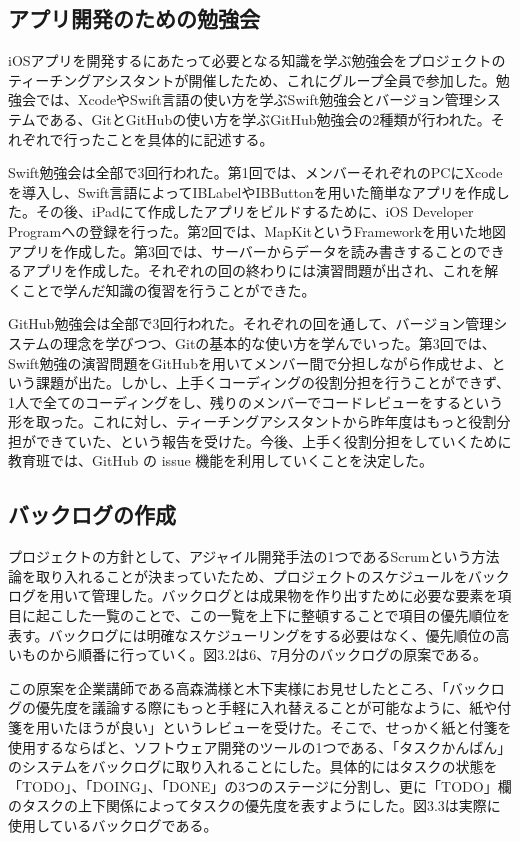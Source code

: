 \documentclass[openany,11pt,papersize]{jsbook}
\begin{document}
\subsection{アプリ開発のための勉強会}
\par iOSアプリを開発するにあたって必要となる知識を学ぶ勉強会をプロジェクトのティーチングアシスタントが開催したため、これにグループ全員で参加した。勉強会では、XcodeやSwift言語の使い方を学ぶSwift勉強会とバージョン管理システムである、GitとGitHubの使い方を学ぶGitHub勉強会の2種類が行われた。それぞれで行ったことを具体的に記述する。
\par Swift勉強会は全部で3回行われた。第1回では、メンバーそれぞれのPCにXcodeを導入し、Swift言語によってIBLabelやIBButtonを用いた簡単なアプリを作成した。その後、iPadにて作成したアプリをビルドするために、iOS Developer Programへの登録を行った。第2回では、MapKitというFrameworkを用いた地図アプリを作成した。第3回では、サーバーからデータを読み書きすることのできるアプリを作成した。それぞれの回の終わりには演習問題が出され、これを解くことで学んだ知識の復習を行うことができた。
\par GitHub勉強会は全部で3回行われた。それぞれの回を通して、バージョン管理システムの理念を学びつつ、Gitの基本的な使い方を学んでいった。第3回では、Swift勉強の演習問題をGitHubを用いてメンバー間で分担しながら作成せよ、という課題が出た。しかし、上手くコーディングの役割分担を行うことができず、1人で全てのコーディングをし、残りのメンバーでコードレビューをするという形を取った。これに対し、ティーチングアシスタントから昨年度はもっと役割分担ができていた、という報告を受けた。今後、上手く役割分担をしていくために教育班では、GitHub の issue 機能を利用していくことを決定した。

\subsection{バックログの作成}
\par プロジェクトの方針として、アジャイル開発手法の1つであるScrumという方法論を取り入れることが決まっていたため、プロジェクトのスケジュールをバックログを用いて管理した。バックログとは成果物を作り出すために必要な要素を項目に起こした一覧のことで、この一覧を上下に整頓することで項目の優先順位を表す。バックログには明確なスケジューリングをする必要はなく、優先順位の高いものから順番に行っていく。図3.2は6、7月分のバックログの原案である。

\par この原案を企業講師である高森満様と木下実様にお見せしたところ、「バックログの優先度を議論する際にもっと手軽に入れ替えることが可能なように、紙や付箋を用いたほうが良い」というレビューを受けた。そこで、せっかく紙と付箋を使用するならばと、ソフトウェア開発のツールの1つである、「タスクかんばん」のシステムをバックログに取り入れることにした。具体的にはタスクの状態を「TODO」、「DOING」、「DONE」の3つのステージに分割し、更に「TODO」欄のタスクの上下関係によってタスクの優先度を表すようにした。図3.3は実際に使用しているバックログである。
\end{document}
